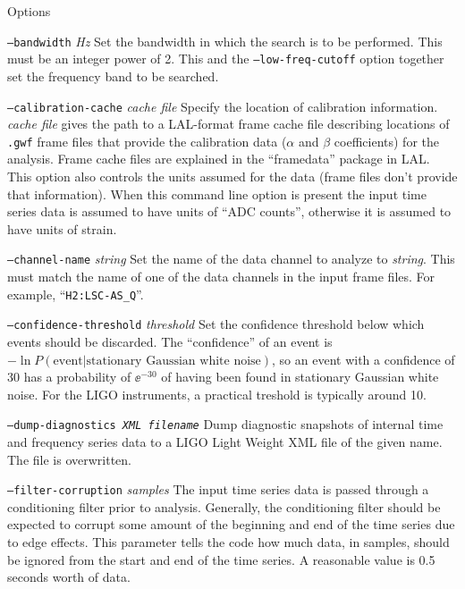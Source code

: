\documentclass[10pt]{article}
\newcommand{\option}[1]{\texttt{#1}}
\newcommand{\parm}[1]{\textit{#1}}
\newenvironment{entry}%
{\begin{list}{}{\renewcommand{\makelabel}[1]%
{\parbox[b]{\labelwidth}{\makebox[0pt][l]{\textbf{##1}}\\}}%
\setlength{\labelwidth}{1em}%
\setlength{\labelsep}{1em}%
\setlength{\leftmargin}{2em}%
\setlength{\topsep}{\medskipamount}%
\setlength{\itemsep}{\medskipamount}%
\setlength{\parsep}{\medskipamount}%
\setlength{\listparindent}{0pt}}}
{\end{list}}
\begin{document}
\begin{entry}
\item[Options]\leavevmode
\begin{entry}
\item[\option{--bandwidth} \parm{Hz}]
Set the bandwidth in which the search is to be performed.  This must be an
integer power of 2.  This and the \option{--low-freq-cutoff} option
together set the frequency band to be searched.

\item[\option{--calibration-cache} \parm{cache file}]
Specify the location of calibration information.  \parm{cache file} gives
the path to a LAL-format frame cache file describing locations of
\texttt{.gwf} frame files that provide the calibration data ($\alpha$ and
$\beta$ coefficients) for the analysis.  Frame cache files are explained in
the ``framedata'' package in LAL.  This option also controls the units
assumed for the data (frame files don't provide that information).  When
this command line option is present the input time series data is assumed
to have units of ``ADC counts'', otherwise it is assumed to have units of
strain.

\item[\option{--channel-name} \parm{string}]
Set the name of the data channel to analyze to \parm{string}.  This must
match the name of one of the data channels in the input frame files.  For
example, ``\verb|H2:LSC-AS_Q|''.

\item[\option{--confidence-threshold} \parm{threshold}]
Set the confidence threshold below which events should be discarded.  The
``confidence'' of an event is \(-\ln P(\text{event} | \text{stationary
Gaussian white noise})\), so an event with a confidence of 30 has a
probability of \(\ee^{-30}\) of having been found in stationary Gaussian
white noise.  For the LIGO instruments, a practical treshold is typically
around 10.

\item[\option{--dump-diagnostics \parm{XML filename}}]
Dump diagnostic snapshots of internal time and frequency series data to a
LIGO Light Weight XML file of the given name.  The file is overwritten.

\item[\option{--filter-corruption} \parm{samples}]
The input time series data is passed through a conditioning filter prior to
analysis.  Generally, the conditioning filter should be expected to corrupt
some amount of the beginning and end of the time series due to edge
effects.  This parameter tells the code how much data, in samples, should
be ignored from the start and end of the time series.  A reasonable value
is 0.5 seconds worth of data.


\end{entry}
\end{entry}
\end{document}
